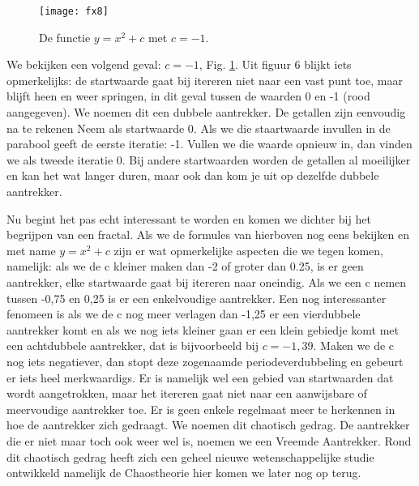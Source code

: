 \documentclass[11pt,fleqn]{book} %
\begin{document}
\begin{figure}[h]
	\centering\texttt{[image: fx8]}
	\caption{De functie $y=x^2+c$ met $c=-1$.}
	\label{fig:fx8}
\end{figure}
We bekijken een volgend geval: $c =-1$, Fig. \ref{fig:fx8}.
Uit figuur 6 blijkt iets opmerkelijks: de startwaarde gaat bij itereren niet naar een vast punt toe, maar blijft heen en weer springen, in dit geval tussen de waarden 0 en -1 (rood aangegeven). We noemen dit een dubbele aantrekker. De getallen zijn eenvoudig na te rekenen Neem als startwaarde 0. Als we die staartwaarde invullen in de parabool geeft de eerste iteratie: -1. Vullen we die waarde opnieuw in, dan vinden we als tweede iteratie 0. Bij andere startwaarden worden de getallen al moeilijker en kan het wat langer duren, maar ook dan kom je uit op dezelfde dubbele aantrekker.

Nu begint het pas echt interessant te worden en komen we dichter bij het begrijpen van een fractal. Als we de formules van hierboven nog eens bekijken en met name $y=x^2+c$ zijn er wat opmerkelijke aspecten die we tegen komen, namelijk: als we de c kleiner maken dan -2 of groter dan 0.25, is er geen aantrekker, elke startwaarde gaat bij itereren naar oneindig. 
Als we een c nemen tussen -0,75 en 0,25 is er een enkelvoudige aantrekker.
Een nog interessanter fenomeen is als we de c nog meer verlagen dan -1,25 er een vierdubbele aantrekker komt en als we nog iets kleiner gaan er een klein gebiedje komt met een achtdubbele aantrekker, dat is bijvoorbeeld bij $c=-1,39$. Maken we de c nog iets negatiever, dan stopt deze zogenaamde periodeverdubbeling en gebeurt er iets heel merkwaardigs. Er is namelijk wel een gebied van startwaarden dat wordt aangetrokken, maar het itereren gaat niet naar een aanwijsbare of meervoudige aantrekker toe. Er is geen enkele regelmaat meer te herkennen in hoe de aantrekker zich gedraagt. We noemen dit chaotisch gedrag. De aantrekker die er niet maar toch ook weer wel is, noemen we een Vreemde Aantrekker. Rond dit chaotisch gedrag heeft zich een geheel nieuwe wetenschappelijke studie ontwikkeld namelijk de Chaostheorie hier komen we later nog op terug.
\end{document}
